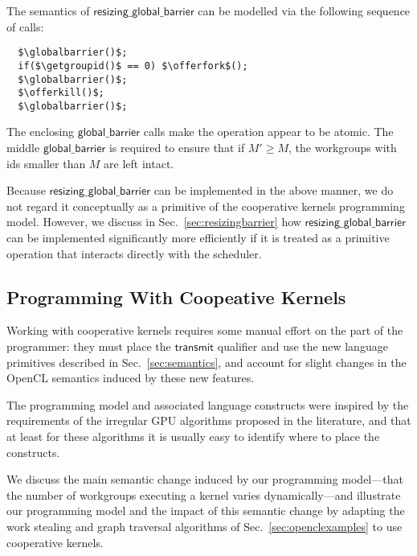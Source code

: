 \documentclass[numbers,nocopyrightspace,10pt]{sigplanconf}
\newcommand{\mysec}{Sec.~}
\newcommand{\transmit}{\mathsf{transmit}}
\newcommand{\offerfork}{\mathsf{offer\_fork}}
\newcommand{\offerkill}{\mathsf{offer\_kill}}
\newcommand{\globalbarrier}{\mathsf{global\_barrier}}
\newcommand{\resizingglobalbarrier}{\mathsf{resizing\_global\_barrier}}
\newcommand{\getgroupid}{\mathsf{get\_group\_id}}
\begin{document}
The semantics of $\resizingglobalbarrier$ can be modelled via the following sequence of calls:

\lstset{basicstyle=\tt,numbers=none}
\begin{lstlisting}
  $\globalbarrier()$;
  if($\getgroupid()$ == 0) $\offerfork$();
  $\globalbarrier()$;
  $\offerkill()$;
  $\globalbarrier()$;
\end{lstlisting}
\lstset{basicstyle=\scriptsize\tt,numbers=left}

The enclosing $\globalbarrier$ calls make the operation appear to be
atomic.  The middle $\globalbarrier$ is required to ensure that if
$M'\geq M$, the workgroups with ids smaller than $M$ are left intact.

Because $\resizingglobalbarrier$ can be implemented in the above
manner, we do not regard it conceptually as a primitive of the
cooperative kernels programming model.  However, we discuss in
\mysec\ref{sec:resizingbarrier} how $\resizingglobalbarrier$ can be
implemented significantly more efficiently if it is treated as a
primitive operation that interacts directly with the scheduler.

\subsection{Programming With Coopeative Kernels}\label{sec:programmingguidelines}

Working with cooperative kernels requires some manual effort on the
part of the programmer: they must place the $\transmit$ qualifier and
use the new language primitives described in
\mysec\ref{sec:semantics}, and account for slight changes in the OpenCL semantics induced by these new features.

The programming model and associated language constructs were inspired
by the requirements of the irregular GPU algorithms proposed in the
literature, and that at least for these algorithms it is usually easy
to identify where to place the constructs.

We discuss the main semantic change induced by our programming
model---that the number of workgroups executing a kernel varies
dynamically---and illustrate our programming model and the impact of
this semantic change by adapting the work stealing and graph traversal
algorithms of \mysec\ref{sec:openclexamples} to use cooperative
kernels.
\end{document}
